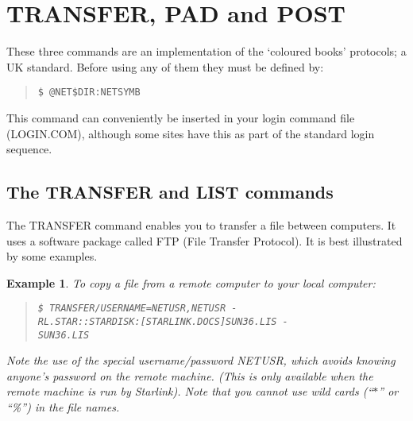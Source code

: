 \appendix

\section{TRANSFER, PAD and POST}
\label{cbs}

These three commands are an implementation of the `coloured books' protocols;
a UK standard.
Before using any of them they must be defined by:
\begin{quote}
{\tt \$ @NET\$DIR:NETSYMB}
\end{quote}
This command can conveniently be inserted in your login command file
(LOGIN.COM), although some sites have this as part of the standard login
sequence.
\subsection{The TRANSFER and LIST commands}
The TRANSFER command enables you to transfer a file between computers.
It uses a software package called FTP (File Transfer Protocol).
It is best illustrated by some examples.
\newtheorem{example}{Example}[subsection]
\begin{example}\rm
To copy a file from a remote computer to your local computer:
\begin{quote}
{\tt \$ TRANSFER/USERNAME=NETUSR,NETUSR -\\
\hspace*{25mm}RL.STAR::STARDISK:[STARLINK.DOCS]SUN36.LIS -\\
\hspace*{25mm}SUN36.LIS}
\end{quote}
Note the use of the special username/password NETUSR, which avoids knowing
anyone's password on the remote machine.
(This is only available when the remote machine is run by Starlink).
Note that you cannot use wild cards (``$*$'' or ``\%'') in the file names.
\end{example}
